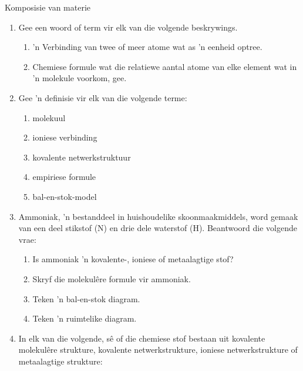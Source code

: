 \label{m38120*secfhsst!!!underscore!!!id497}
            \begin{eocexercises}{Komposisie van materie}
            \nopagebreak
            \label{m38120*id311490}\begin{enumerate}[noitemsep, label=\textbf{\arabic*}. ] 
            \label{m38120*uid87}\item Gee een woord of term vir elk van die volgende beskrywings.
\label{m38120*id34411506}\begin{enumerate}[noitemsep, label=\textbf{\alph*}. ] 
            \label{m38120*uid90}\item 'n Verbinding van twee of meer atome wat as 'n eenheid optree.
\label{m38120*uid9221}\item Chemiese formule wat die relatiewe aantal atome van elke element wat in 'n molekule voorkom, gee.
\end{enumerate}
\label{m38120*uid227}\item Gee 'n definisie vir elk van die volgende terme: 
\label{m38120*id311506}\begin{enumerate}[noitemsep, label=\textbf{\alph*}. ] 
            \label{m38120*uid930}\item molekuul
\label{m38120*uid91}\item ioniese verbinding
\item kovalente netwerkstruktuur
\item empiriese formule
\item bal-en-stok-model\end{enumerate}
\label{m38120*uid92}\item Ammoniak, 'n bestanddeel in huishoudelike skoonmaakmiddels, word gemaak van een deel stikstof ($\text{N}$) en drie dele waterstof ($\text{H}$). Beantwoord die volgende vrae:
\label{m38120*id311590}\begin{enumerate}[noitemsep, label=\textbf{\alph*}. ] 
            \label{m38120*uid94}\item Is ammoniak 'n kovalente-, ioniese of metaalagtige stof?
\label{m38120*uid95}\item Skryf die molekul\^{e}re formule vir ammoniak.
\label{m38120*uid96}\item Teken 'n bal-en-stok diagram.
\label{m38120*uid97}\item Teken 'n ruimtelike diagram.
\end{enumerate}
            \label{m38120*uid11}\item In elk van die volgende, sê of die chemiese stof bestaan uit kovalente molekul\^{e}re strukture, kovalente netwerkstrukture, ioniese netwerkstrukture of metaalagtige strukture:

\end{enumerate}
\end{eocexercises}
